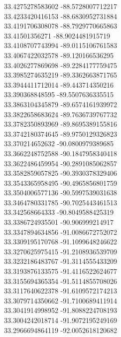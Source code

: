{33.4275278583602	-88.5728007712217\\
33.4233420416153	-88.6830952731884\\
33.4191706308078	-88.7929770665863\\
33.41501356271	-88.9024481915719\\
33.4108707743994	-89.0115106761583\\
33.4067422032578	-89.120166536295\\
33.4026277869698	-89.2284177759475\\
33.3985274635219	-89.3362663871765\\
33.3944411712014	-89.443714350216\\
33.390368848595	-89.5507636335515\\
33.3863104345879	-89.6574161939972\\
33.3822658683624	-89.7636739767732\\
33.3782350893969	-89.8695389155816\\
33.3742180374645	-89.9750129326823\\
33.370214652632	-90.0800979389685\\
33.3662248752588	-90.1847958340418\\
33.3622486459954	-90.2891085062857\\
33.3582859057825	-90.3930378329406\\
33.3543365958495	-90.4965856801759\\
33.3504006577136	-90.5997539031638\\
33.3464780331785	-90.7025443461513\\
33.342568664333	-90.8049588425319\\
33.3386724935501	-90.906999214917\\
33.3347894634856	-91.0086672752072\\
33.3309195170768	-91.1099648246622\\
33.3270625975415	-91.2108936539709\\
33.3232186483767	-91.3114555433209\\
33.3193876133575	-91.4116522624677\\
33.3155694365354	-91.5114855708026\\
33.3117640622378	-91.6109572174213\\
33.3079714350662	-91.7100689411914\\
33.3041914998952	-91.8088224708193\\
33.3004242018714	-91.9072195249169\\
33.2966694864119	-92.0052618120682\\
}
